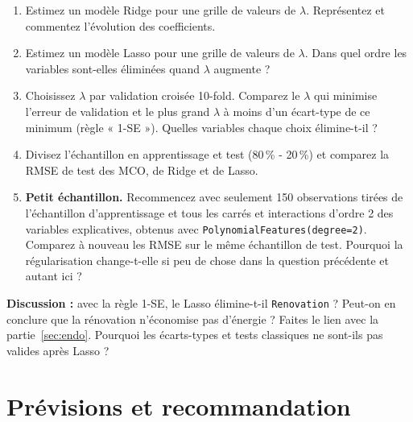 \documentclass[11pt,a4paper]{article}
\newcommand{\var}[1]{\texttt{#1}}
\begin{document}
\begin{enumerate}
  \item Estimez un modèle Ridge pour une grille de valeurs de $\lambda$. Représentez et commentez l'évolution des coefficients.
  \item Estimez un modèle Lasso pour une grille de valeurs de $\lambda$. Dans quel ordre les variables sont-elles éliminées quand $\lambda$ augmente ?
  \item Choisissez $\lambda$ par validation croisée 10-fold. Comparez le $\lambda$ qui minimise l'erreur de validation et le plus grand $\lambda$ à moins d'un écart-type de ce minimum (règle « 1-SE »). Quelles variables chaque choix élimine-t-il ?
  \item Divisez l'échantillon en apprentissage et test (80\,\% - 20\,\%) et comparez la RMSE de test des MCO, de Ridge et de Lasso.
  \item \textbf{Petit échantillon.} Recommencez avec seulement 150 observations tirées de l'échantillon d'apprentissage et tous les carrés et interactions d'ordre 2 des variables explicatives, obtenus avec \texttt{PolynomialFeatures(degree=2)}. Comparez à nouveau les RMSE sur le même échantillon de test. Pourquoi la régularisation change-t-elle si peu de chose dans la question précédente et autant ici ?
\end{enumerate}

\begin{question}
\textbf{Discussion :} avec la règle 1-SE, le Lasso élimine-t-il \var{Renovation} ? Peut-on en conclure que la rénovation n'économise pas d'énergie ? Faites le lien avec la partie~\ref{sec:endo}. Pourquoi les écarts-types et tests classiques ne sont-ils pas valides après Lasso ?
\end{question}

\section{Prévisions et recommandation}
\end{document}
